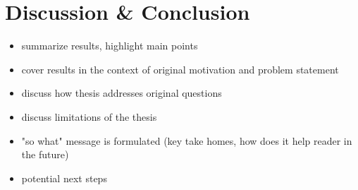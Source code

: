 \chapter{Discussion \& Conclusion}
\label{cha:discussion}

\begin{itemize}
    \item summarize results, highlight main points
    \item cover results in the context of original motivation and problem statement
    \item discuss how thesis addresses original questions
    \item discuss limitations of the thesis
    \item "so what" message is formulated (key take homes, how does it help reader in the future)
    \item potential next steps
\end{itemize}